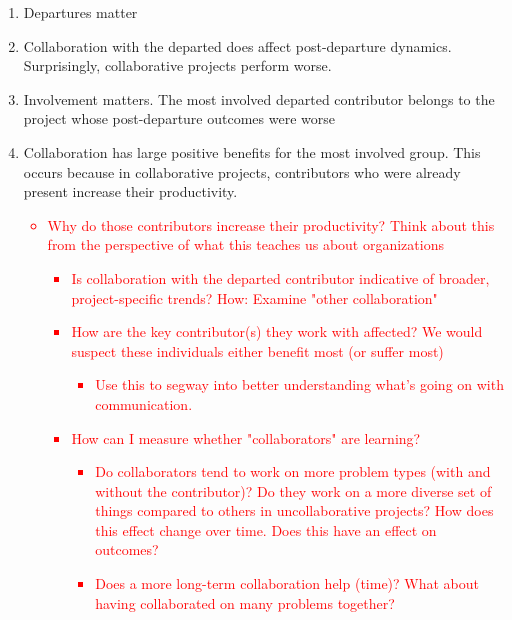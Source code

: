 \documentclass[12pt,notitlepage]{article}
\begin{document}
\begin{enumerate}
    \item Departures matter
    \item Collaboration with the departed does affect post-departure dynamics. Surprisingly, collaborative projects perform worse. 
    \item Involvement matters. The most involved departed contributor belongs to the project whose post-departure outcomes were worse
    \item Collaboration has large positive benefits for the most involved group. This occurs because in collaborative projects, contributors who were already present increase their productivity. 
    \textcolor{red}{
        \begin{itemize}
            \item Why do those contributors increase their productivity? Think about this from the perspective of what this teaches us about organizations
            \begin{itemize}
                \item Is collaboration with the departed contributor indicative of broader, project-specific trends? How: Examine "other collaboration"
                \item How are the key contributor(s) they work with affected? We would suspect these individuals either benefit most (or suffer most)
                \begin{itemize}
                    \item Use this to segway into better understanding what's going on with communication. 
                \end{itemize}
                \item How can I measure whether "collaborators" are learning?
                \begin{itemize}
                    \item Do collaborators tend to work on more problem types (with and without the contributor)? Do they work on a more diverse set of things compared to others in uncollaborative projects? How does this effect change over time. Does this have an effect on outcomes?
                    \item Does a more long-term collaboration help (time)? What about having collaborated on many problems together?

\end{itemize}
\end{itemize}
\end{itemize}}
\end{enumerate}
\end{document}
